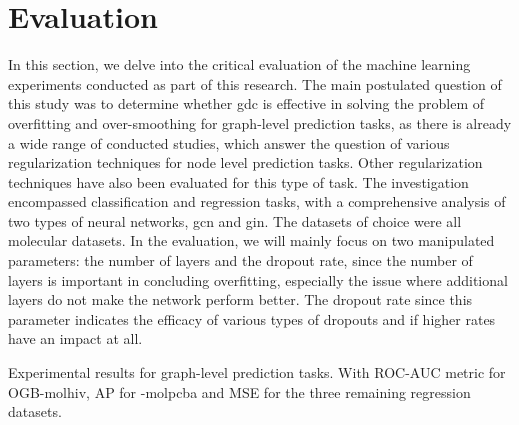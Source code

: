 %
\chapter{Evaluation}
\label{sec:eval}

In this section, we delve into the critical evaluation of the machine learning experiments conducted as part of this research.
The main postulated question of this study was to determine whether \ac{gdc} is effective in solving the problem of overfitting and over-smoothing for graph-level prediction tasks, as there is already a wide range of conducted studies, which answer the question of various regularization techniques for node level prediction tasks. Other regularization techniques have also been evaluated for this type of task.
The investigation encompassed classification and regression tasks, with a comprehensive analysis of two types of neural networks, \ac{gcn} and \ac{gin}.
The datasets of choice were all molecular datasets.
In the evaluation, we will mainly focus on two manipulated parameters: the number of layers and the dropout rate, since the number of layers is important in concluding overfitting, especially the issue where additional layers do not make the network perform better. The dropout rate since this parameter indicates the efficacy of various types of dropouts and if higher rates have an impact at all.

\begin{table*}[t]
    \caption{
        Experimental results for graph-level prediction tasks. With ROC-AUC metric for OGB-molhiv, AP for -molpcba and MSE for the three remaining regression datasets.
    }\label{tbl:eval:results}
    \centering
    {\small%
        }
\end{table*}

